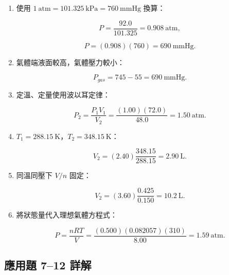 \documentclass[11pt,a4paper]{article}
\begin{document}
\begin{enumerate}
\def\labelenumi{\arabic{enumi}.}
\item
  使用 \(1\ \mathrm{atm}=101.325\ \mathrm{kPa}=760\ \mathrm{mmHg}\) 換算：

  \[
  P=\frac{92.0}{101.325}=0.908\ \mathrm{atm},
  \]

  \[
  P=(0.908)(760)=690\ \mathrm{mmHg}.
  \]
\item
  氣體端液面較高，氣體壓力較小：

  \[
  P_{gas}=745-55=690\ \mathrm{mmHg}.
  \]
\item
  定溫、定量使用波以耳定律：

  \[
  P_2=\frac{P_1V_1}{V_2}=\frac{(1.00)(72.0)}{48.0}=1.50\ \mathrm{atm}.
  \]
\item
  \(T_1=288.15\ \mathrm K\)，\(T_2=348.15\ \mathrm K\)：

  \[
  V_2=(2.40)\frac{348.15}{288.15}=2.90\ \mathrm L.
  \]
\item
  同溫同壓下 \(V/n\) 固定：

  \[
  V_2=(3.60)\frac{0.425}{0.150}=10.2\ \mathrm L.
  \]
\item
  將狀態量代入理想氣體方程式：

  \[
  P=\frac{nRT}{V}
  =\frac{(0.500)(0.082057)(310)}{8.00}
  =1.59\ \mathrm{atm}.
  \]
\end{enumerate}

\subsection{應用題 7--12 詳解}\label{ux61c9ux7528ux984c-712-ux8a73ux89e3}
\end{document}
